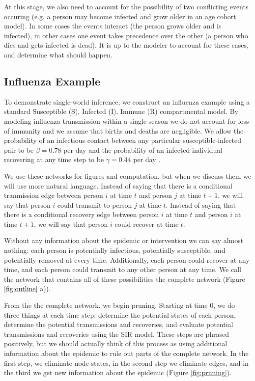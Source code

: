\documentclass[PTRSB]{rsos}
\begin{document}
\begin{multicols}{2}
At this stage, we also need to account for the possibility of two conflicting events occuring (e.g. a person may become infected and grow older in an age cohort model).
In some cases the events interact (the person grows older and is infected), in other cases one event takes precedence over the other (a person who dies and gets infected is dead).
It is up to the modeler to account for these cases, and determine what should happen.

\subsection*{Influenza Example}
To demonstrate single-world inference, we construct an influenza example using a standard Susceptible (S), Infected (I), Immune (R) compartmental model.
By modeling influenza transmission within a single season we do not account for loss of immunity and we assume that births and deaths are negligible.
We allow the probability of an infectious contact between any particular susceptible-infected pair to be $\beta = 0.78$ per day and the probability of an infected individual recovering at any time step to be $\gamma = 0.44$ per day \cite{forsberg-white-et-al:2009}.


We use these networks for figures and computation, but when we discuss them we will use more natural language.
Instead of saying that there is a conditional tranmission edge between person $i$ at time $t$ and person $j$ at time $t+1$, we will say that person $i$ could transmit to person $j$ at time $t$.
Instead of saying that there is a conditional recovery edge between person $i$ at time $t$ and person $i$ at time $t+1$, we will say that person $i$ could recover at time $t$.

Without any information about the epidemic or intervention we can say almost nothing: each person is potentially infectious, potentially susceptible, and potentially removed at every time.
Additionally, each person could recover at any time, and each person could transmit to any other person at any time.
We call the network that contains all of these possibilities the complete network (Figure \ref{fig:outline} a)).

From the the complete network, we begin pruning.
Starting at time $0$, we do three things at each time step: determine the potential states of each person, determine the potential transmissions and recoveries, and evaluate potential transmissions and recoveries using the SIR model.
These steps are phrased positively, but we should actually think of this process as using additional information about the epidemic to rule out parts of the complete network.
In the first step, we eliminate node states, in the second step we eliminate edges, and in the third we get new information about the epidemic (Figure \ref{fig:pruning}).


\end{multicols}
\end{document}
